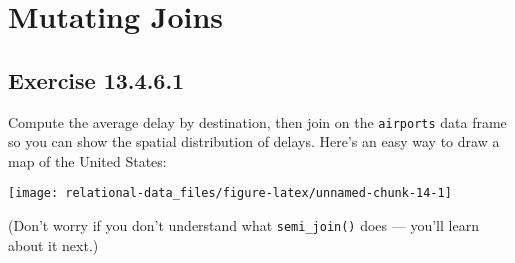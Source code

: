 \documentclass[]{book}
\newenvironment{Shaded}{\begin{snugshade}}{\end{snugshade}}
\newcommand{\KeywordTok}[1]{\textcolor[rgb]{0.13,0.29,0.53}{\textbf{#1}}}
\newcommand{\NormalTok}[1]{#1}
\newcommand{\OperatorTok}[1]{\textcolor[rgb]{0.81,0.36,0.00}{\textbf{#1}}}
\newcommand{\StringTok}[1]{\textcolor[rgb]{0.31,0.60,0.02}{#1}}
\theoremstyle{plain}
\theoremstyle{remark}
\begin{document}
\hypertarget{mutating-joins}{%
\section{Mutating Joins}\label{mutating-joins}}

\begin{Shaded}
\end{Shaded}

\hypertarget{exercise-13.4.6.1}{%
\subsection*{\texorpdfstring{Exercise
{13.4.6.1}}{Exercise 13.4.6.1}}\label{exercise-13.4.6.1}}

Compute the average delay by destination, then join on the
\texttt{airports} data frame so you can show the spatial distribution of
delays. Here's an easy way to draw a map of the United States:

\begin{Shaded}
\end{Shaded}

\begin{center}\texttt{[image: relational-data\_files/figure-latex/unnamed-chunk-14-1]} \end{center}

(Don't worry if you don't understand what \texttt{semi\_join()} does ---
you'll learn about it next.)
\end{document}

